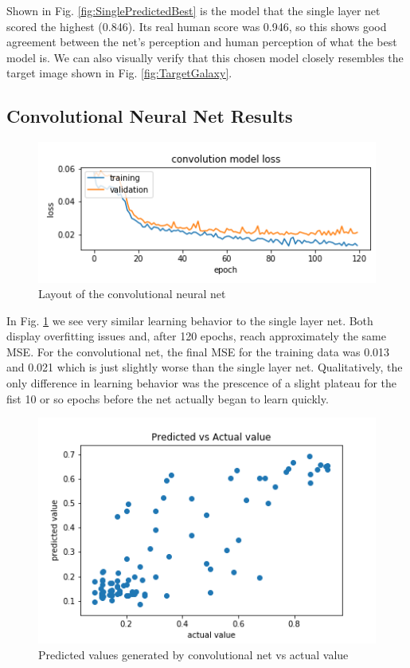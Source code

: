 \documentclass[conference]{IEEEtran}
\begin{document}
Shown in Fig. \ref{fig:SinglePredictedBest} is the model that the single layer net scored the highest (0.846). Its real human score was 0.946, so this shows good agreement between the net's perception and human perception of what the best model is. We can also visually verify that this chosen model closely resembles the target image shown in Fig. \ref{fig:TargetGalaxy}.

\subsection{Convolutional Neural Net Results}

\begin{figure}[htbp]
\centerline{\includegraphics[width=0.75\linewidth]{./Images/ConvModelLoss.png}}
\caption{Layout of the convolutional neural net}
\label{fig:ConvModelLoss}
\end{figure}

In Fig. \ref{fig:ConvModelLoss} we see very similar learning behavior to the single layer net. Both display overfitting issues and, after 120 epochs, reach approximately the same MSE. For the convolutional net, the final MSE for the training data was 0.013 and 0.021 which is just slightly worse than the single layer net. Qualitatively, the only difference in learning behavior was the prescence of a slight plateau for the fist 10 or so epochs before the net actually began to learn quickly.

\begin{figure}[htbp]
\centerline{\includegraphics[width=0.75\linewidth]{./Images/ConvPredictedVAct.png}}
\caption{Predicted values generated by convolutional net vs actual value}
\label{fig:ConvPredictedVAct}
\end{figure}
\end{document}

